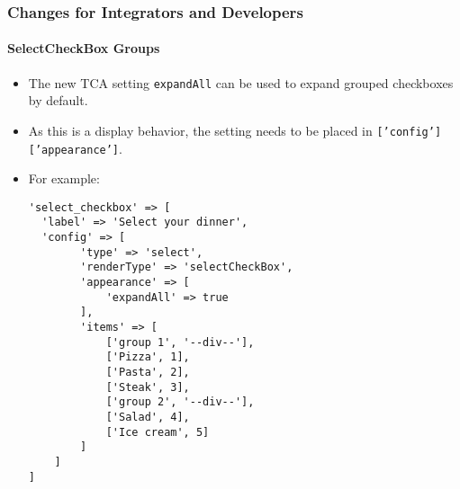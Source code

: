 %

\begin{frame}[fragile]
	\frametitle{Changes for Integrators and Developers}
	\framesubtitle{SelectCheckBox Groups}

	\lstset{basicstyle=\tiny\ttfamily}

	\begin{itemize}
		\item The new TCA setting \texttt{expandAll} can be used to expand
			grouped checkboxes by default.
		\item As this is a display behavior, the setting needs to be placed
		 	in \texttt{['config']['appearance']}.
		\item For example:
\begin{lstlisting}
'select_checkbox' => [
  'label' => 'Select your dinner',
  'config' => [
        'type' => 'select',
        'renderType' => 'selectCheckBox',
        'appearance' => [
            'expandAll' => true
        ],
        'items' => [
            ['group 1', '--div--'],
            ['Pizza', 1],
            ['Pasta', 2],
            ['Steak', 3],
            ['group 2', '--div--'],
            ['Salad', 4],
            ['Ice cream', 5]
        ]
    ]
]
\end{lstlisting}

	\end{itemize}

\end{frame}

